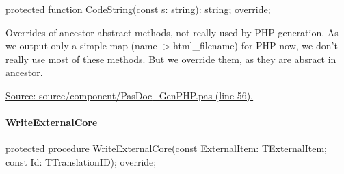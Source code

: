 \documentclass{report}
\newif\ifpdf
\begin{document}
\label{PasDoc_GenPHP.TPHPDocGenerator-CodeString}
\begin{list}{}{
\setlength{\itemindent}{0cm}
\setlength{\listparindent}{0cm}
\setlength{\leftmargin}{\evensidemargin}
\addtolength{\leftmargin}{\tmplength}
\settowidth{\labelsep}{X}
\addtolength{\leftmargin}{\labelsep}
\setlength{\labelwidth}{\tmplength}
}
\item[\textbf{Declaration}\hfill]
\ifpdf
\begin{flushleft}
\fi
\begin{ttfamily}
protected function CodeString(const s: string): string; override;\end{ttfamily}

\ifpdf
\end{flushleft}
\fi

\par
\item[\textbf{Description}]
Overrides of ancestor abstract methods, not really used by PHP generation. As we output only a simple map (name{-}{$>$}html{\_}filename) for PHP now, we don't really use most of these methods. But we override them, as they are absract in ancestor.\par
\href{https://github.com/pasdoc/pasdoc/blob/master/source/component/PasDoc_GenPHP.pas#L56}{Source: source/component/PasDoc{\_}GenPHP.pas (line 56).}

\end{list}
\paragraph*{WriteExternalCore}\hspace*{\fill}

\label{PasDoc_GenPHP.TPHPDocGenerator-WriteExternalCore}
\begin{list}{}{
\setlength{\itemindent}{0cm}
\setlength{\listparindent}{0cm}
\setlength{\leftmargin}{\evensidemargin}
\addtolength{\leftmargin}{\tmplength}
\settowidth{\labelsep}{X}
\addtolength{\leftmargin}{\labelsep}
\setlength{\labelwidth}{\tmplength}
}
\item[\textbf{Declaration}\hfill]
\ifpdf
\begin{flushleft}
\fi
\begin{ttfamily}
protected procedure WriteExternalCore(const ExternalItem: TExternalItem; const Id: TTranslationID); override;\end{ttfamily}

\ifpdf
\end{flushleft}
\fi

\end{list}
\end{document}

